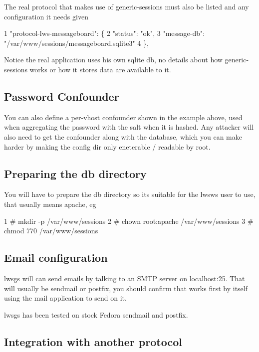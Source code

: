 The real protocol that makes use of generic-\/sessions must also be listed and any configuration it needs given


\begin{DoxyCode}
1 "protocol-lws-messageboard": \{
2   "status": "ok",
3   "message-db": "/var/www/sessions/messageboard.sqlite3"
4 \},
\end{DoxyCode}


Notice the real application uses his own sqlite db, no details about how generic-\/sessions works or how it stores data are available to it.

\subsection*{Password Confounder }

You can also define a per-\/vhost confounder shown in the example above, used when aggregating the password with the salt when it is hashed. Any attacker will also need to get the confounder along with the database, which you can make harder by making the config dir only eneterable / readable by root.

\subsection*{Preparing the db directory }

You will have to prepare the db directory so it\textquotesingle{}s suitable for the lwsws user to use, that usually means apache, eg


\begin{DoxyCode}
1 # mkdir -p /var/www/sessions
2 # chown root:apache /var/www/sessions
3 # chmod 770 /var/www/sessions
\end{DoxyCode}


\subsection*{Email configuration }

lwsgs will can send emails by talking to an S\+M\+TP server on localhost\+:25. That will usually be sendmail or postfix, you should confirm that works first by itself using the {\ttfamily mail} application to send on it.

lwsgs has been tested on stock Fedora sendmail and postfix.

\subsection*{Integration with another protocol }

